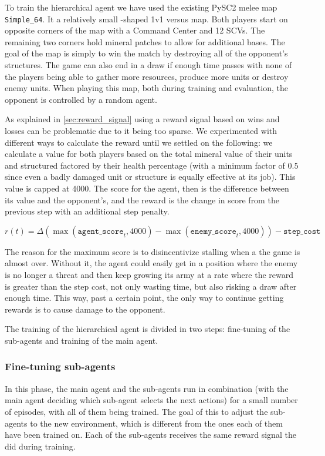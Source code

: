 To train the hierarchical agent we have used the existing PySC2 melee map \texttt{Simple\_64}. It a relatively small -shaped 1v1 versus map. Both players start on opposite corners of the map with a Command Center and 12 SCVs. The remaining two corners hold mineral patches to allow for additional bases. The goal of the map is simply to win the match by destroying all of the opponent's structures. The game can also end in a draw if enough time passes with none of the players being able to gather more resources, produce more units or destroy enemy units. When playing this map, both during training and evaluation, the opponent is controlled by a random agent.

As explained in \ref{sec:reward_signal} using a reward signal based on wins and losses can be problematic due to it being too sparse. We experimented with different ways to calculate the reward until we settled on the following: we calculate a value for both players based on the total mineral value of their units and structured factored by their health percentage (with a minimum factor of $0.5$ since even a badly damaged unit or structure is equally effective at its job). This value is capped at 4000. The score for the agent, then is the difference between its value and the opponent's, and the reward is the change in score from the previous step with an additional step penalty.

$$
r(t) = \Delta(\max(\texttt{agent\_score}_{t}, 4000) - \max(\texttt{enemy\_score}_{t}, 4000)) - \texttt{step\_cost}
$$

The reason for the maximum score is to disincentivize stalling when a the game is almost over. Without it, the agent could easily get in a position where the enemy is no longer a threat and then keep growing its army at a rate where the reward is greater than the step cost, not only wasting time, but also risking a draw after enough time. This way, past a certain point, the only way to continue getting rewards is to cause damage to the opponent.

The training of the hierarchical agent is divided in two steps: fine-tuning of the sub-agents and training of the main agent.

\subsubsection*{Fine-tuning sub-agents}

In this phase, the main agent and the sub-agents run in combination (with the main agent deciding which sub-agent selects the next actions) for a small number of episodes, with all of them being trained. The goal of this to adjust the sub-agents to the new environment, which is different from the ones each of them have been trained on. Each of the sub-agents receives the same reward signal the did during training.

